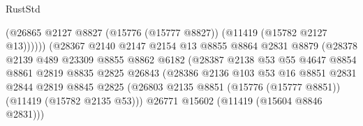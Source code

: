 \begin{lexlean}{RustStd}
\begin{coremodule}
                                            (@26865
                                              @2127
                                              @8827
                                              (@15776 (@15777 @8827))
                                              (@11419 (@15782 @2127 @13))))))
                                      (@28367
                                        @2140
                                        @2147
                                        @2154
                                        @13
                                        @8855
                                        @8864
                                        @2831
                                        @8879
                                        (@28378
                                          @2139
                                          @489
                                          @23309
                                          @8855
                                          @8862
                                          @6182
                                          (@28387
                                            @2138
                                            @53
                                            @55
                                            @4647
                                            @8854
                                            @8861
                                            @2819
                                            @8835
                                            @2825
                                            @26843
                                            (@28386
                                              @2136
                                              @103
                                              @53
                                              @16
                                              @8851
                                              @2831
                                              @2844
                                              @2819
                                              @8845
                                              @2825
                                              (@26803
                                                @2135
                                                @8851
                                                (@15776 (@15777 @8851))
                                                (@11419 (@15782 @2135 @53)))
                                              @26771
                                              @15602
                                              (@11419 (@15604 @8846 @2831)))

\end{coremodule}
\end{lexlean}
